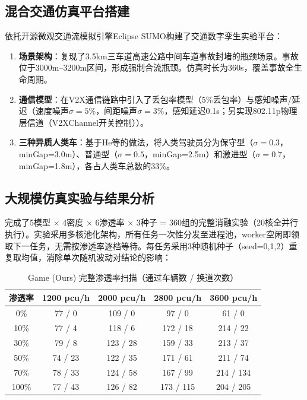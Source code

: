\subsection{混合交通仿真平台搭建}
依托开源微观交通流模拟引擎Eclipse SUMO构建了交通数字孪生实验平台：

\begin{enumerate}
    \item \textbf{场景架构}：复现了3.5km三车道高速公路中间车道事故封堵的瓶颈场景。事故位于3000m--3200m区间，形成强制合流瓶颈。仿真时长为360s，覆盖事故全生命周期。
    \item \textbf{通信模型}：在V2X通信链路中引入了丢包率模型（5\%丢包率）与感知噪声/延迟（速度噪声$\sigma=5\%$，间距噪声$\sigma=3\%$，感知延迟0.1s；另实现802.11p物理层信道（V2XChannel开关控制））。
    \item \textbf{三种异质人类车}：基于He等的做法，将人类驾驶员分为保守型（$\sigma=0.3$，minGap=3.0m）、普通型（$\sigma=0.5$，minGap=2.5m）和激进型（$\sigma=0.7$，minGap=1.8m），各占人类车总数的33\%。
\end{enumerate}

\subsection{大规模仿真实验与结果分析}
完成了5模型 $\times$ 4密度 $\times$ 6渗透率 $\times$ 3种子 = 360组的完整消融实验（20核全并行执行）。实验采用多核池化架构，所有任务一次性分发至进程池，worker空闲即领取下一任务，无需按渗透率逐档等待。每任务采用3种随机种子（seed=0,1,2）重复取均值，消除单次随机波动对结论的影响：

\begin{table}[H]
\centering
\caption{Game (Ours) 完整渗透率扫描（通过车辆数 / 换道次数）}
\label{tab:penetration}
\small
\begin{tabular}{c|cccc}
\hline
渗透率 & 1200 pcu/h & 2000 pcu/h & 2800 pcu/h & 3600 pcu/h \\
\hline
0\% & 77 / 0 & 109 / 0 & 97 / 0 & 61 / 0 \\
10\% & 77 / 4 & 118 / 6 & 172 / 18 & 214 / 22 \\
30\% & 79 / 8 & 123 / 28 & 159 / 33 & 213 / 37 \\
50\% & 74 / 23 & 122 / 35 & 171 / 61 & 211 / 74 \\
70\% & 78 / 33 & 124 / 58 & 167 / 99 & 214 / 134 \\
100\% & 77 / 43 & 126 / 82 & 173 / 115 & 204 / 205 \\
\hline
\end{tabular}
\end{table}

